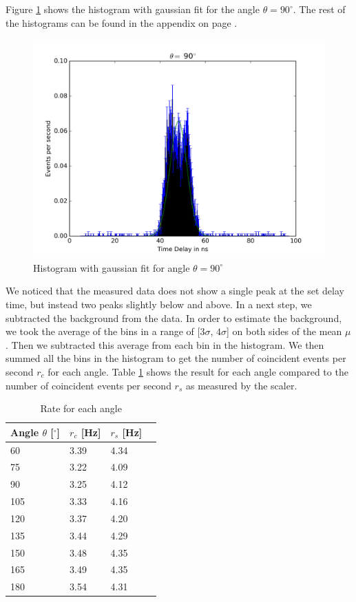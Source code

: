 \documentclass[a4paper,parskip,11pt, DIV12]{scrreprt}
\begin{document}
Figure \ref{fig:hist120} shows the histogram with gaussian fit for the angle $\theta = 90^{\circ}$. The rest of the histograms can be found in the appendix on page \pageref{app:histogram}.
%
\begin{figure}[H]
\centering
\includegraphics[scale=0.65]{90deg.png}
\caption[Histogram]{Histogram with gaussian fit for angle $\theta = 90^{\circ}$}
\label{fig:hist120}
\end{figure}
%
We noticed that the measured data does not show a single peak at the set delay time, but instead two peaks slightly below and above. In a next step, we subtracted the background from the data. In order to estimate the background, we took the average of the bins in a range of [$3\sigma$, $4\sigma$] on both sides of the mean $\mu$. Then we subtracted this average from each bin in the histogram. We then summed all the bins in the histogram to get the number of coincident events per second $r_c$ for each angle. Table \ref{tab:nevents} shows the result for each angle compared to the number of coincident events per second $r_{s}$ as measured by the scaler.
%
\begin{table}[H]
\begin{center}
\begin{tabular}{llll}
Angle $\theta$ [$^{\circ}$] & $r_{c}$ [Hz] & $r_{s}$ [Hz]\\
\hline
60 	& 3.39 & 4.34\\
  75 	& 3.22 & 4.09\\
  90 	& 3.25 & 4.12\\
105 	& 3.33 & 4.16\\
120	& 3.37 & 4.20\\
135	& 3.44 & 4.29\\
150	& 3.48 & 4.35\\
165	& 3.49 & 4.35\\
180	& 3.54 & 4.31\\ 
\end{tabular}
\caption{Rate for each angle}
\label{tab:nevents}
\end{center}
\end{table}
\end{document}
